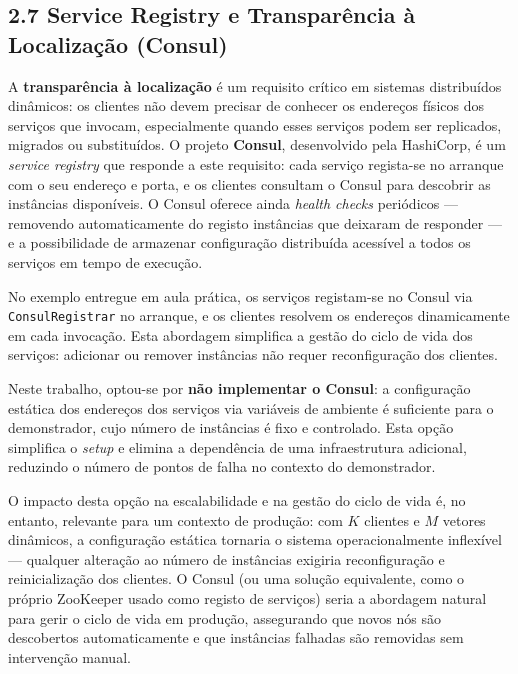\subsection*{2.7 Service Registry e Transparência à Localização (Consul)}

A \textbf{transparência à localização} é um requisito crítico em sistemas distribuídos dinâmicos:
os clientes não devem precisar de conhecer os endereços físicos dos serviços que invocam,
especialmente quando esses serviços podem ser replicados, migrados ou substituídos. O projeto
\textbf{Consul}, desenvolvido pela HashiCorp, é um \textit{service registry} que responde a este
requisito: cada serviço regista-se no arranque com o seu endereço e porta, e os clientes
consultam o Consul para descobrir as instâncias disponíveis. O Consul oferece ainda
\textit{health checks} periódicos --- removendo automaticamente do registo instâncias que deixaram
de responder --- e a possibilidade de armazenar configuração distribuída acessível a todos os
serviços em tempo de execução.

No exemplo entregue em aula prática, os serviços registam-se no Consul via
\texttt{ConsulRegistrar} no arranque, e os clientes resolvem os endereços dinamicamente em cada
invocação. Esta abordagem simplifica a gestão do ciclo de vida dos serviços: adicionar ou remover
instâncias não requer reconfiguração dos clientes.

Neste trabalho, optou-se por \textbf{não implementar o Consul}: a configuração estática dos
endereços dos serviços via variáveis de ambiente é suficiente para o demonstrador, cujo número
de instâncias é fixo e controlado. Esta opção simplifica o \textit{setup} e elimina a dependência
de uma infraestrutura adicional, reduzindo o número de pontos de falha no contexto do
demonstrador.

O impacto desta opção na escalabilidade e na gestão do ciclo de vida é, no entanto, relevante
para um contexto de produção: com $K$ clientes e $M$ vetores dinâmicos, a configuração estática
tornaria o sistema operacionalmente inflexível --- qualquer alteração ao número de instâncias
exigiria reconfiguração e reinicialização dos clientes. O Consul (ou uma solução equivalente,
como o próprio ZooKeeper usado como registo de serviços) seria a abordagem natural para gerir o
ciclo de vida em produção, assegurando que novos nós são descobertos automaticamente e que
instâncias falhadas são removidas sem intervenção manual.
